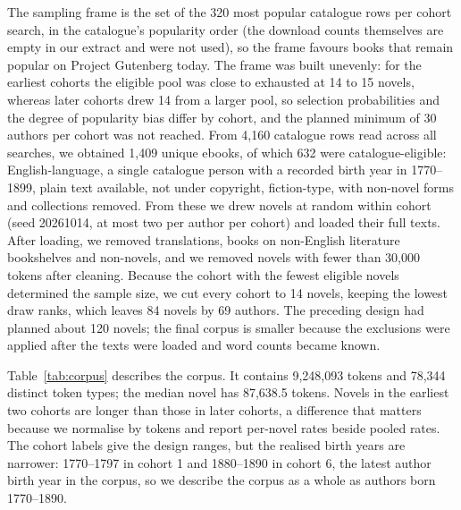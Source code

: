 \documentclass[11pt]{article}
\begin{document}
The sampling frame is the set of the 320 most popular catalogue rows per cohort search, in the catalogue's popularity order (the download counts themselves are empty in our extract and were not used), so the frame favours books that remain popular on Project Gutenberg today. The frame was built unevenly: for the earliest cohorts the eligible pool was close to exhausted at 14 to 15 novels, whereas later cohorts drew 14 from a larger pool, so selection probabilities and the degree of popularity bias differ by cohort, and the planned minimum of 30 authors per cohort was not reached. From 4,160 catalogue rows read across all searches,
we obtained 1,409 unique ebooks,
of which 632 were catalogue-eligible: English-language, a single catalogue person with a recorded birth year in 1770--1899, plain text available, not under copyright, fiction-type, with non-novel forms and collections removed.
From these we drew novels at random within cohort (seed 20261014, at most two per author per cohort) and loaded their full texts. After loading, we removed translations, books on non-English literature bookshelves and non-novels,
and we removed novels with fewer than 30,000 tokens after cleaning.
Because the cohort with the fewest eligible novels determined the sample size, we cut every cohort to 14 novels, keeping the lowest draw ranks, which leaves 84 novels by 69 authors.
The preceding design had planned about 120 novels; the final corpus is smaller because the exclusions were applied after the texts were loaded and word counts became known.

Table~\ref{tab:corpus} describes the corpus. It contains 9,248,093 tokens and 78,344 distinct token types; the median novel has 87,638.5 tokens.
Novels in the earliest two cohorts are longer than those in later cohorts, a difference that matters because we normalise by tokens and report per-novel rates beside pooled rates. The cohort labels give the design ranges, but the realised birth years are narrower: 1770--1797 in cohort 1 and 1880--1890 in cohort 6, the latest author birth year in the corpus, so we describe the corpus as a whole as authors born 1770--1890.
\end{document}
